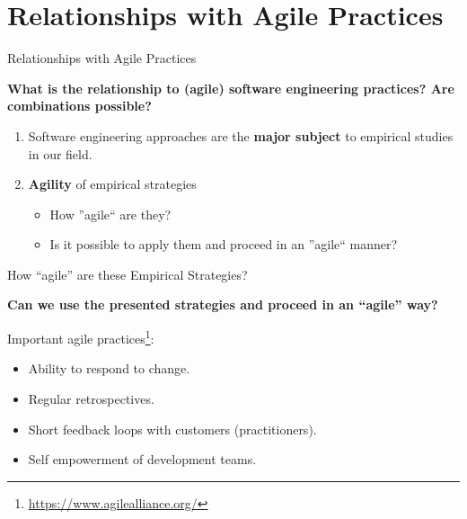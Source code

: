 \documentclass[10pt]{beamer}
\begin{document}
\section{Relationships with Agile Practices}

\begin{frame}{Relationships with Agile Practices}
	
	\textbf{What is the relationship to (agile) software engineering practices? Are combinations possible?}
	
	\bigskip
	\begin{enumerate}
		\item Software engineering approaches are the \textbf{major subject} to empirical studies in our field.
		\bigskip
		\item \textbf{Agility} of empirical strategies
		\begin{itemize}
			\item How ''agile`` are they?
			\item Is it possible to apply them and proceed in an ''agile`` manner?
		\end{itemize}
	\end{enumerate}
	
\end{frame}

\begin{frame}{How ``agile'' are these Empirical Strategies?}
	
	\textbf{Can we use the presented strategies and proceed in an ``agile'' way?}
	
	\bigskip
	Important agile practices\footnote{\url{https://www.agilealliance.org/}}:
	\begin{itemize}
		\item Ability to respond to change.
		\item Regular retrospectives.
		\item Short feedback loops with customers (practitioners).
		\item Self empowerment of development teams.
	\end{itemize}
	
\end{frame}
\end{document}
